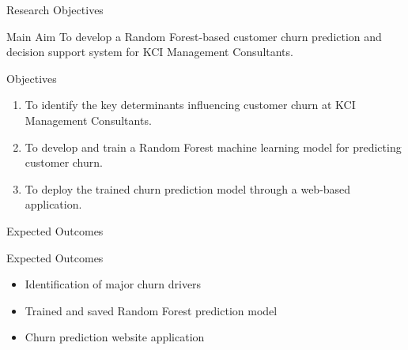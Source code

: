 \documentclass[10pt]{beamer}
\begin{document}
\begin{frame}{Research Objectives}
	
	\small
	
	\begin{block}{Main Aim}
		To develop a Random Forest-based customer churn prediction and decision support system for KCI Management Consultants.
	\end{block}
	
	\vspace{0.3cm}
	
	\begin{exampleblock}{Objectives}
		\begin{enumerate}
			\item To identify the key determinants influencing customer churn at KCI Management Consultants.
			
			\item To develop and train a Random Forest machine learning model for predicting customer churn.
			
			\item To deploy the trained churn prediction model through a web-based application.
		\end{enumerate}
	\end{exampleblock}
	
\end{frame}
	
	
\begin{frame}{Expected Outcomes}
	
	\small
	\begin{exampleblock}{Expected Outcomes}
			\begin{itemize}
				\item Identification of major churn drivers
		
	
				\item Trained and saved Random Forest prediction model
				
				\item Churn prediction website application
			\end{itemize}
		\end{exampleblock}
		

	
\end{frame}
	
\end{document}
